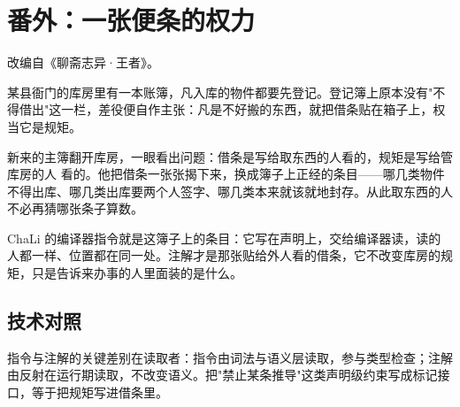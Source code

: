 \section{番外：一张便条的权力}

改编自《聊斋志异·王者》。

某县衙门的库房里有一本账簿，凡入库的物件都要先登记。登记簿上原本没有"不得借出"这一栏，差役便自作主张：凡是不好搬的东西，就把借条贴在箱子上，权当它是规矩。

新来的主簿翻开库房，一眼看出问题：借条是写给取东西的人看的，规矩是写给管库房的人 看的。他把借条一张张揭下来，换成簿子上正经的条目——哪几类物件不得出库、哪几类出库要两个人签字、哪几类本来就该就地封存。从此取东西的人不必再猜哪张条子算数。

ChaLi 的编译器指令就是这簿子上的条目：它写在声明上，交给编译器读，读的人都一样、位置都在同一处。注解才是那张贴给外人看的借条，它不改变库房的规矩，只是告诉来办事的人里面装的是什么。

\subsection*{技术对照}

指令与注解的关键差别在读取者：指令由词法与语义层读取，参与类型检查；注解由反射在运行期读取，不改变语义。把"禁止某条推导"这类声明级约束写成标记接口，等于把规矩写进借条里。
